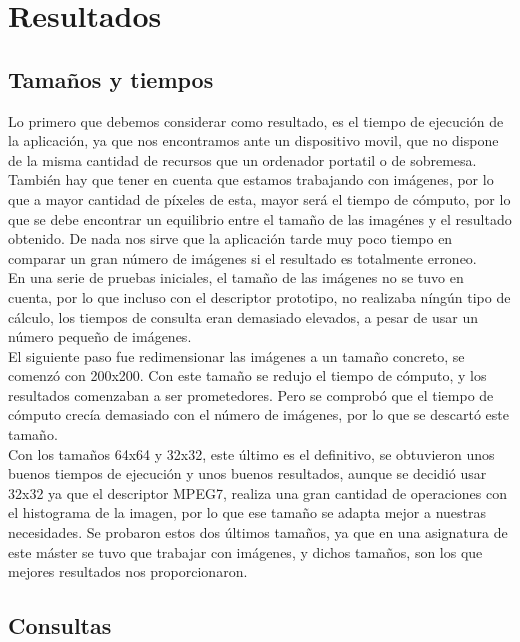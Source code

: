 \chapter{Resultados}
\label{cap:resultados}

\section{Tamaños y tiempos}
Lo primero que debemos considerar como resultado, es el tiempo de ejecución de la aplicación, ya que nos encontramos ante un dispositivo movil, que no dispone de la misma cantidad de recursos que un ordenador portatil o de sobremesa.\\

También hay que tener en cuenta que estamos trabajando con imágenes, por lo que a mayor cantidad de píxeles de esta, mayor será el tiempo de cómputo, por lo que se debe encontrar un equilibrio entre el tamaño de las imagénes y el resultado obtenido. De nada nos sirve que la aplicación tarde muy poco tiempo en comparar un gran número de imágenes si el resultado es totalmente erroneo.\\

En una serie de pruebas iniciales, el tamaño de las imágenes no se tuvo en cuenta, por lo que incluso con el descriptor prototipo, no realizaba níngún tipo de cálculo, los tiempos de consulta eran demasiado elevados, a pesar de usar un número pequeño de imágenes.\\

El siguiente paso fue redimensionar las imágenes a un tamaño concreto, se comenzó con 200x200. Con este tamaño se redujo el tiempo de cómputo, y los resultados comenzaban a ser prometedores. Pero se comprobó que el tiempo de cómputo crecía demasiado con el número de imágenes, por lo que se descartó este tamaño.\\

Con los tamaños 64x64 y 32x32, este último es el definitivo, se obtuvieron unos buenos tiempos de ejecución y unos buenos resultados, aunque se decidió usar 32x32 ya que el descriptor MPEG7, realiza una gran cantidad de operaciones con el histograma de la imagen, por lo que ese tamaño se adapta mejor a nuestras necesidades. Se probaron estos dos últimos tamaños, ya que en una asignatura de este máster se tuvo que trabajar con imágenes, y dichos tamaños, son los que mejores resultados nos proporcionaron.\\

\section{Consultas}

